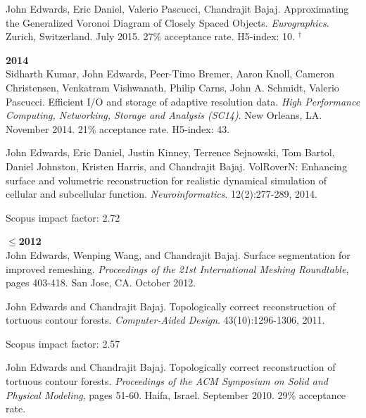 \documentclass[margin,line]{res}
\newcommand{\pubunder}[1]{#1}
\newcommand{\pnum}[1]{}
\begin{document}
\begin{resume}
\pnum{8} \pubunder{John Edwards}, Eric Daniel, Valerio Pascucci, Chandrajit Bajaj. Approximating the Generalized Voronoi Diagram of Closely Spaced Objects. \textit{Eurographics}. Zurich, Switzerland. July 2015. 27\% acceptance rate. H5-index: 10.
$^\dagger$

\textbf{2014} \\
\pnum{7} Sidharth Kumar, \pubunder{John Edwards}, Peer-Timo Bremer, Aaron Knoll, Cameron Christensen, Venkatram Vishwanath, Philip Carns, John A. Schmidt, Valerio Pascucci. Efficient I/O and storage of adaptive resolution data. \textit{High Performance Computing, Networking, Storage and Analysis (SC14)}. New Orleans, LA. November 2014. 21\% acceptance rate. H5-index: 43.

\pnum{6} \pubunder{John Edwards}, Eric Daniel, Justin Kinney, Terrence Sejnowski, Tom Bartol, Daniel Johnston, Kristen Harris, and Chandrajit Bajaj. VolRoverN: Enhancing surface and volumetric reconstruction for realistic dynamical simulation of cellular and subcellular function.  \textit{Neuroinformatics}. 12(2):277-289, 2014.
\begin{IMPACT}
Scopus impact factor: 2.72 %
\end{IMPACT}

\textbf{$\le$2012} \\
\pnum{5} \pubunder{John Edwards}, Wenping Wang, and Chandrajit Bajaj. Surface segmentation for improved remeshing. \textit{Proceedings of the 21st International Meshing Roundtable}, pages 403-418. San Jose, CA. October 2012.

\pnum{4} \protect \pubunder{John Edwards} and Chandrajit Bajaj. Topologically correct reconstruction of tortuous contour forests. \textit{Computer-Aided Design}. 43(10):1296-1306, 2011.
\begin{IMPACT}
Scopus impact factor: 2.57 %
\end{IMPACT}

\pnum{3} \pubunder{John Edwards} and Chandrajit Bajaj. Topologically correct reconstruction of tortuous contour forests. \textit{Proceedings of the ACM Symposium on Solid and Physical Modeling}, pages 51-60. Haifa, Israel. September 2010. 29\% acceptance rate.


\end{resume}
\end{document}

